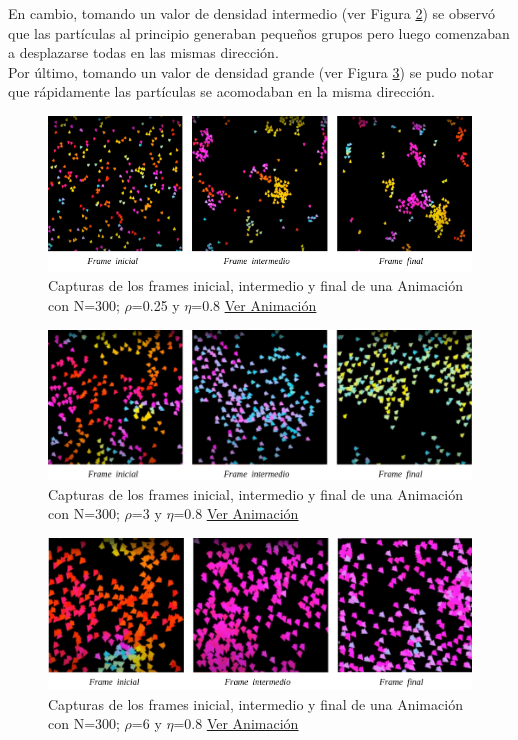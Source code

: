 \documentclass[12pt, a4paper]{report}
\begin{document}
En cambio, tomando un valor de densidad intermedio (ver Figura \ref{fig:density_N300_n08_d3}) se observó que las partículas al principio generaban pequeños grupos pero luego comenzaban a desplazarse todas en las mismas dirección.\\

Por último, tomando un valor de densidad grande (ver Figura \ref{fig:density_N300_n08_d6}) se pudo notar que rápidamente las partículas se acomodaban en la misma dirección. 

\begin{figure}[h]
\includegraphics[scale=0.54]{density_N300_n08_d025.png}
\centering 
\caption{Capturas de los frames inicial, intermedio y final de una Animación con N=300; $\rho$=0.25 y $\eta$=0.8 \href{https://www.youtube.com/watch?v=j0crtCYmx9E}{\underline{Ver Animación}}}
\label{fig:density_N300_n08_d025}
\end{figure}

\begin{figure}[h]
\includegraphics[scale=0.4]{density_N300_n08_d3.png}
\centering 
\caption{Capturas de los frames inicial, intermedio y final de una Animación con N=300; $\rho$=3 y $\eta$=0.8 \href{https://www.youtube.com/watch?v=Ez3LWEwRvmk}{\underline{Ver Animación}}}
\label{fig:density_N300_n08_d3}
\end{figure}

\pagebreak
\begin{figure}[h]
\includegraphics[scale=0.4]{density_N300_n08_d6.png}
\centering 
\caption{Capturas de los frames inicial, intermedio y final de una Animación con N=300; $\rho$=6 y $\eta$=0.8 \href{https://www.youtube.com/watch?v=t88TD__ushc}{\underline{Ver Animación}}} %
\label{fig:density_N300_n08_d6}
\end{figure}
\end{document}
